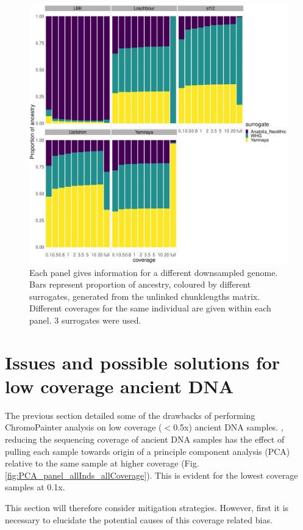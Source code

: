 \begin{figure}[htp]
    \centering
    \includegraphics[width=1.0\textwidth]{../images/chapter1/3pop_SF_downsampled_unlinked.pdf}
    \caption{Each panel gives information for a different downsampled genome. Bars represent proportion of ancestry, coloured by different surrogates, generated from the unlinked chunklengths matrix. Different coverages for the same individual are given within each panel. 3 surrogates were used.}
    \label{fig:SOURCEFIND_3pop_unlinked_downsampled}
\end{figure}

\section{Issues and possible solutions for low coverage ancient DNA}

The previous section detailed some of the drawbacks of performing ChromoPainter analysis on low coverage ($<$0.5x) ancient DNA samples. , reducing the sequencing coverage of ancient DNA samples has the effect of pulling each sample towards origin of a principle component analysis (PCA) relative to the same sample at higher coverage (Fig. \ref{fig:PCA_panel_allInds_allCoverage}). This is evident for the lowest coverage samples at 0.1x. 

This section will therefore consider mitigation strategies. However, first it is necessary to elucidate the potential causes of this coverage related bias. 

